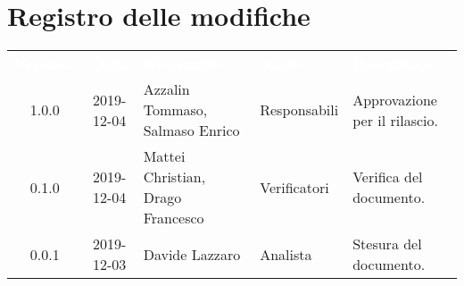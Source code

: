\section*{Registro delle modifiche}
{
\renewcommand{\arraystretch}{1.5}
\centering
\begin{longtable}{ c c  C{4cm}  C{3cm} C{4cm}}
\textcolor{white}{\textbf{Versione}} & \textcolor{white}{\textbf{Data}} & \textcolor{white}{\textbf{Nominativo}} & \textcolor{white}{\textbf{Ruolo}} & \textcolor{white}{\textbf{Descrizione}}\\	


1.0.0 & 2019-12-04 & Azzalin Tommaso, Salmaso Enrico & Responsabili & Approvazione per il rilascio.  \\
		
0.1.0 & 2019-12-04 & Mattei Christian, Drago Francesco & Verificatori & Verifica del documento.  \\
		
0.0.1 & 2019-12-03 & Davide Lazzaro & Analista & Stesura del documento.  \\
		
		
\end{longtable}
}